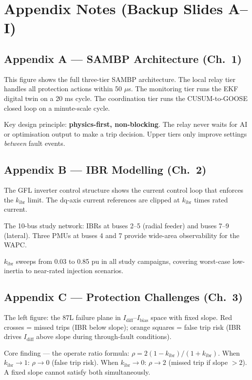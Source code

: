 \documentclass[12pt, a4paper]{article}
\newenvironment{notebox}{%
  \begin{tcolorbox}[
    colback=noteBg,
    colframe=iitmMaroon!40,
    boxrule=0.6pt,
    arc=3pt,
    left=8pt, right=8pt, top=6pt, bottom=6pt
  ]
  \setstretch{1.4}\small
}{%
  \end{tcolorbox}
}
\begin{document}
\section*{Appendix Notes (Backup Slides A--I)}

\subsection*{Appendix A --- SAMBP Architecture (Ch.\ 1)}
\begin{notebox}
This figure shows the full three-tier SAMBP architecture. The local relay tier handles
all protection actions within 50 $\mu$s. The monitoring tier runs the EKF digital twin
on a 20 ms cycle. The coordination tier runs the CUSUM-to-GOOSE closed loop on a
minute-scale cycle.

Key design principle: \textbf{physics-first, non-blocking}. The relay never waits for
AI or optimisation output to make a trip decision. Upper tiers only improve settings
\emph{between} fault events.
\end{notebox}

\subsection*{Appendix B --- IBR Modelling (Ch.\ 2)}
\begin{notebox}
The GFL inverter control structure shows the current control loop that enforces the
$k_\text{ibr}$ limit. The dq-axis current references are clipped at $k_\text{ibr}$ times
rated current.

The 10-bus study network: IBRs at buses 2--5 (radial feeder) and buses 7--9 (lateral).
Three PMUs at buses 4 and 7 provide wide-area observability for the WAPC.

$k_\text{ibr}$ sweeps from 0.03 to 0.85 pu in all study campaigns,
covering worst-case low-inertia to near-rated injection scenarios.
\end{notebox}

\subsection*{Appendix C --- Protection Challenges (Ch.\ 3)}
\begin{notebox}
The left figure: the 87L failure plane in $I_\text{diff}$--$I_\text{bias}$ space with
fixed slope. Red crosses = missed trips (IBR below slope); orange squares = false trip
risk (IBR drives $I_\text{diff}$ above slope during through-fault conditions).

Core finding --- the operate ratio formula:
$\rho = 2(1-k_\text{ibr}) / (1+k_\text{ibr})$.
When $k_\text{ibr} \to 1$: $\rho \to 0$ (false trip risk).
When $k_\text{ibr} \to 0$: $\rho \to 2$ (missed trip if slope $> 2$).
A fixed slope cannot satisfy both simultaneously.
\end{notebox}
\end{document}
